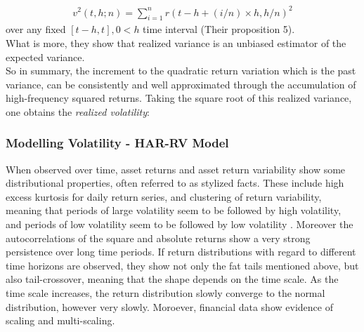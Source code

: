\begin{align}\label{eq:RV-andersen}
v^2(t,h;n) = \sum_{i=1}^{n} r(t-h+(i/n) \times h,h/n)^2
\end{align}
over any fixed $[t-h,t], 0 < h$ time interval (Their proposition 5).\\
What is more, they show that realized variance is an unbiased estimator of the expected variance.\\
So in summary, the increment to the quadratic return variation which is the past variance, can be consistently and well approximated through the accumulation of high-frequency squared returns. Taking the square root of this realized variance, one obtains the \emph{realized volatility}:
\\ 


\subsubsection{Modelling Volatility - HAR-RV Model}\label{sec:222HAR-RV}
When observed over time, asset returns and asset return variability show some distributional properties, often referred to as stylized facts. These include high excess kurtosis for daily return series, and clustering of return variability, meaning that periods of large volatility seem to be followed by high volatility, and periods of low volatility seem to be followed by low volatility \parencite{tsay2005}. Moreover the autocorrelations of the square and absolute returns show a very strong persistence over long time periods. If return distributions with regard to different time horizons are observed, they show not only the fat tails mentioned above, but also tail-crossover, meaning that the shape depends on the time scale. As the time scale increases, the return distribution slowly converge to the normal distribution, however very slowly. Moroever, financial data show evidence of scaling and multi-scaling\parencite{corsi2009}. 

